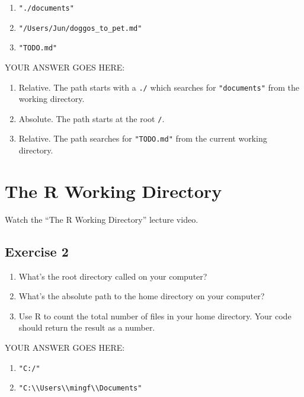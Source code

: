 \documentclass[
]{article}
\providecommand{\tightlist}{%
  \setlength{\itemsep}{0pt}\setlength{\parskip}{0pt}}
\begin{document}
\begin{enumerate}
\def\labelenumi{\arabic{enumi}.}
\tightlist
\item
  \texttt{"./documents"}
\item
  \texttt{"/Users/Jun/doggos\_to\_pet.md"}
\item
  \texttt{"TODO.md"}
\end{enumerate}

YOUR ANSWER GOES HERE:

\begin{enumerate}
\def\labelenumi{\arabic{enumi}.}
\item
  Relative. The path starts with a \texttt{./} which searches for
  \texttt{"documents"} from the working directory.
\item
  Absolute. The path starts at the root \texttt{/}.
\item
  Relative. The path searches for \texttt{"TODO.md"} from the current
  working directory.
\end{enumerate}

\hypertarget{the-r-working-directory}{%
\section{The R Working Directory}\label{the-r-working-directory}}

Watch the ``The R Working Directory'' lecture video.

\hypertarget{exercise-2}{%
\subsection{Exercise 2}\label{exercise-2}}

\begin{enumerate}
\def\labelenumi{\arabic{enumi}.}
\tightlist
\item
  What's the root directory called on your computer?
\item
  What's the absolute path to the home directory on your computer?
\item
  Use R to count the total number of files in your home directory. Your
  code should return the result as a number.
\end{enumerate}

YOUR ANSWER GOES HERE:

\begin{enumerate}
\def\labelenumi{\arabic{enumi}.}
\item
  \texttt{"C:/"}
\item
  \texttt{"C:\textbackslash{}\textbackslash{}Users\textbackslash{}\textbackslash{}mingf\textbackslash{}\textbackslash{}Documents"}
\end{enumerate}
\end{document}
